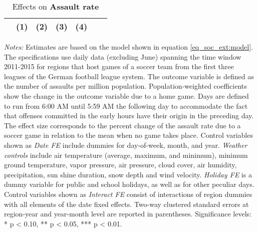 \documentclass[11pt, a4paper]{article} %
\begin{document}
\vspace*{\fill}
\begin{table}[H] \centering 
	\begin{threeparttable} \centering \caption{Effects on \textbf{Assault rate}}\label{tab_soc_ext:reg_fe_assrate}
		{\def\sym#1{\ifmmode^{#1}\else\(^{#1}\)\fi} 
			\begin{tabular}{l*{6}{c}}
				\toprule 
				&\multicolumn{1}{c}{(1)}&\multicolumn{1}{c}{(2)}&\multicolumn{1}{c}{(3)}&\multicolumn{1}{c}{(4)}\\
				\midrule
				 
				\bottomrule 
		\end{tabular}}
		\begin{tablenotes} 
			\item \scriptsize \emph{Notes:} Estimates are based on the model shown in equation \ref{eq_soc_ext:model}. The specifications use daily data (excluding June) spanning the time window 2011-2015 for regions that host games of a soccer team from the first three leagues of the German football league system. The outcome variable is defined as the number of assaults per million population. Population-weighted coefficients show the change in the outcome variable due to a home game. Days are defined to run from 6:00 AM until 5:59 AM the following day to accommodate the fact that offenses committed in the early hours have their origin in the preceding day. The effect size corresponds to the percent change of the assault rate due to a soccer game in relation to the mean when no game takes place. Control variables shown as \textit{Date FE} include dummies for day-of-week, month, and year. \textit{Weather controls} include air temperature (average, maximum, and minimum), minimum ground temperature, vapor pressure, air pressure, cloud cover, air humidity, precipitation, sun shine duration, snow depth and wind velocity. \textit{Holiday FE} is a dummy variable for public and school holidays, as well as for other peculiar days. Control variables shown as \textit{Interact FE} consist of interactions of region dummies with all elements of the date fixed effects. Two-way clustered standard errors at region-year and year-month level are reported in parentheses. \newline Significance levels: * p < 0.10, ** p < 0.05, *** p < 0.01.
		\end{tablenotes} 
	\end{threeparttable} 
\end{table}
\vspace*{\fill}\clearpage 
\end{document}

